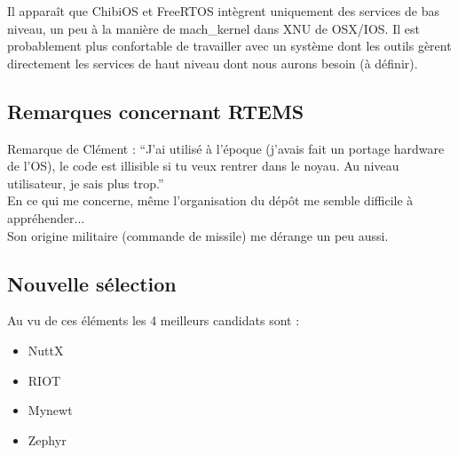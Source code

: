Il apparaît que ChibiOS et FreeRTOS intègrent uniquement des services de bas niveau,
un peu à la manière de mach\_kernel dans XNU de OSX/IOS. Il est probablement plus
confortable de travailler avec un système dont les outils gèrent directement les
services de haut niveau dont nous aurons besoin (à définir).\\





\subsection{Remarques concernant RTEMS}
Remarque de Clément :
\enquote{J'ai utilisé à l'époque (j'avais fait un portage hardware de l'OS), le code
est illisible si tu veux rentrer dans le noyau. Au niveau utilisateur, je sais plus
trop.}\\

En ce qui me concerne, même l'organisation du dépôt me semble difficile à
appréhender...\\

Son origine militaire (commande de missile) me dérange un peu aussi.

\subsection{Nouvelle sélection}
Au vu de ces éléments les 4 meilleurs candidats sont :
\begin{itemize}
	\item NuttX
	\item RIOT
	\item Mynewt
	\item Zephyr\\
\end{itemize}

